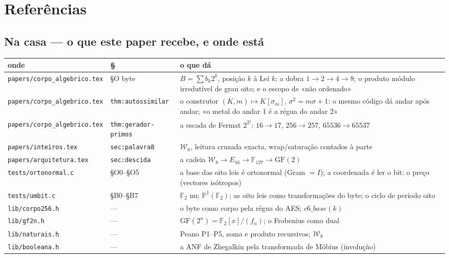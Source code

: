 \documentclass[11pt,a4paper]{article}
\newcommand{\code}[1]{\texttt{\small #1}}
\newcommand{\Word}{\mathcal{W}}
\newcommand{\FF}{\mathbb{F}}
\begin{document}
\section{Referências}\label{sec:refs}

\subsection*{Na casa --- o que este paper recebe, e onde está}

\begin{center}\small
\begin{tabular}{@{}llp{7.2cm}@{}}
\toprule
onde & § & o que dá \\
\midrule
\code{papers/corpo\_algebrico.tex} & §O byte & $B=\sum b_k2^k$, posição $k$ à Lei $k$; a dobra $1\to2\to4\to8$; o produto módulo irredutível de grau oito; e o escopo de «não ordenado» \\
\code{papers/corpo\_algebrico.tex} & \code{thm:autossimilar} & o construtor $(K,m)\mapsto K[\sigma_m]$, $\sigma^2=m\sigma+1$: o mesmo código dá andar após andar; «o metal do andar 1 é a régua do andar 2» \\
\code{papers/corpo\_algebrico.tex} & \code{thm:gerador-primos} & a escada de Fermat $2^{2^{j}}$: $16\to17$, $256\to257$, $65536\to65537$ \\
\code{papers/inteiros.tex} & \code{sec:palavra8} & $\Word_8$, leitura cruzada exacta, wrap/saturação contados à parte \\
\code{papers/arquitetura.tex} & \code{sec:descida} & a cadeia $\Word_8\to E_{16}\to\FF_{127}\to\mathrm{GF}(2)$ \\
\code{tests/ortonormal.c} & §O0--§O5 & a base das oito leis é ortonormal (Gram $=I$); a coordenada é ler o bit; o preço (vectores isótropos) \\
\code{tests/umbit.c} & §B0--§B7 & $\FF_2$ nu; $\mathbb{P}^1(\FF_2)$; as oito leis como transformações do byte; o ciclo de período oito \\
\code{lib/corpo256.h} & --- & o byte como corpo pela régua do AES; $c6\_base(k)$ \\
\code{lib/gf2n.h} & --- & $\mathrm{GF}(2^n)=\FF_2[x]/(f_n)$; o Frobenius como dual \\
\code{lib/naturais.h} & --- & Peano P1--P5, soma e produto recursivos; $\Word_8$ \\
\code{lib/booleana.h} & --- & a ANF de Zhegalkin pela transformada de Möbius (involução) \\
\bottomrule
\end{tabular}
\end{center}
\end{document}
